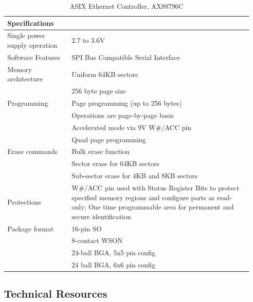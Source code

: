 \begin{table}
    \centering
    \label{fig:AX88796C}%
    \caption{ASIX Ethernet Controller, AX88796C \autocite{AX88796CPdfAX88796C}}
    \begin{tabular}{|p{4cm}|p{12cm}|}
      \hline\rowcolor{gray!30}
  
      \textbf{Specifications} &  \\
      \hline
  
      Single power supply operation & 2.7 to 3.6V \\
      \hline
  
      Software Features & SPI Bus Compatible Serial Interface \\
      \hline
  
      Memory architecture & Uniform 64KB sectors \\
      & 256 byte page size \\
      \hline
  
      Programming & Page programming (up to 256 bytes) \\
      & Operations are page-by-page basis \\
      & Accelerated mode via 9V W\#/ACC pin \\
      & Quad page programming \\
      \hline
  
      Erase commands & Bulk erase function \\
       & Sector erase for 64KB sectors \\
       & Sub-sector erase for 4KB and 8KB sectors \\
      \hline
  
      Protections & W\#/ACC pin used with Status Register Bits to protect specified memory regions and configure parts as read-only; One time programmable area for permanent and secure identification \\
      \hline
  
      Package format & 16-pin SO \\
      & 8-contact WSON \\
      & 24-ball BGA, 5x5 pin config \\
      & 24 ball BGA, 6x6 pin config \\
      \hline
  
    \end{tabular}
\end{table}


\subsection{Technical Resources} \label{technicalresources}

